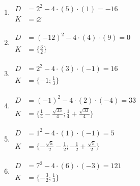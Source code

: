\documentclass[11pt,a4paper]{article}
\begin{document}
\begin{enumerate}[label={},itemsep=9pt]
\item[\textbf{A029}] \(\displaystyle \begin{aligned}D&=2^2-4\cdot(5)\cdot(1)=-16\\K&=\varnothing\end{aligned}\)\par
\item[\textbf{A030}] \(\displaystyle \begin{aligned}D&=(-12)^2-4\cdot(4)\cdot(9)=0\\K&=\{\frac{3}{2}\}\end{aligned}\)\par
\item[\textbf{A031}] \(\displaystyle \begin{aligned}D&=2^2-4\cdot(3)\cdot(-1)=16\\K&=\{-1;\frac{1}{3}\}\end{aligned}\)\par
\item[\textbf{A032}] \(\displaystyle \begin{aligned}D&=(-1)^2-4\cdot(2)\cdot(-4)=33\\K&=\{\frac{1}{4} - \frac{\sqrt{33}}{4};\frac{1}{4} + \frac{\sqrt{33}}{4}\}\end{aligned}\)\par
\item[\textbf{A033}] \(\displaystyle \begin{aligned}D&=1^2-4\cdot(1)\cdot(-1)=5\\K&=\{- \frac{\sqrt{5}}{2} - \frac{1}{2};- \frac{1}{2} + \frac{\sqrt{5}}{2}\}\end{aligned}\)\par
\item[\textbf{A034}] \(\displaystyle \begin{aligned}D&=7^2-4\cdot(6)\cdot(-3)=121\\K&=\{- \frac{3}{2};\frac{1}{3}\}\end{aligned}\)\par
\end{enumerate}
\end{document}
